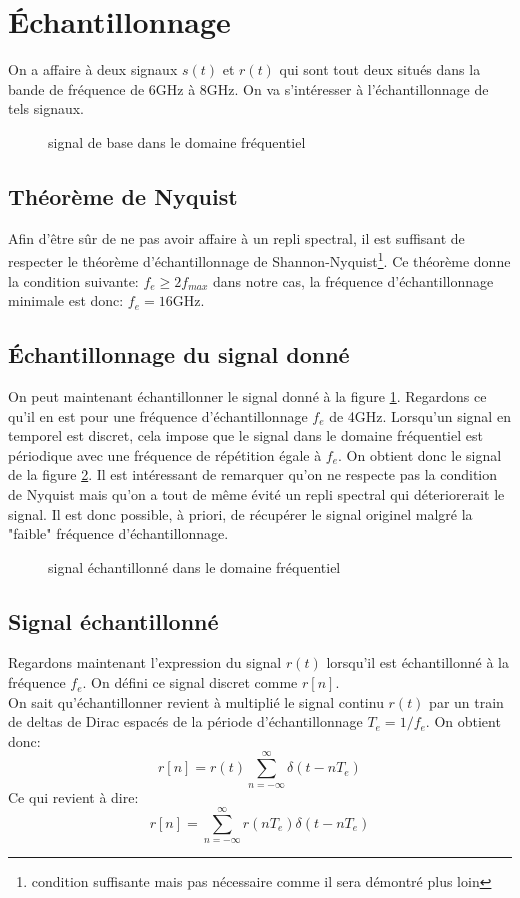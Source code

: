 \documentclass[10pt,a4paper]{article}
\begin{document}
\section{Échantillonnage}
On a affaire à deux signaux $s(t)$ et $r(t)$ qui sont tout deux situés dans la bande de fréquence de 6GHz à 8GHz. On va s'intéresser à l'échantillonnage de tels signaux.
\begin{figure}[h!]
\centering
\caption{signal de base dans le domaine fréquentiel}
\label{sig}
\end{figure}
\subsection{Théorème de Nyquist}
Afin d'être sûr de ne pas avoir affaire à un repli spectral, il est suffisant de respecter le théorème d'échantillonnage de Shannon-Nyquist\footnote{condition suffisante mais pas nécessaire comme il sera démontré plus loin}. Ce théorème donne la condition suivante: $f_e\geqslant 2f_{max}$ dans notre cas, la fréquence d'échantillonnage minimale est donc: $f_e=16\text{GHz}$.
\subsection{Échantillonnage du signal donné}
On peut maintenant échantillonner le signal donné à la figure \ref{sig}. Regardons ce qu'il en est pour une fréquence d'échantillonnage $f_e$ de 4GHz. Lorsqu'un signal en temporel est discret, cela impose que le signal dans le domaine fréquentiel est périodique avec une fréquence de répétition égale à $f_e$. On obtient donc le signal de la figure \ref{sig2}. Il est intéressant de remarquer qu'on ne respecte pas la condition de Nyquist mais qu'on a tout de même évité un repli spectral qui déteriorerait le signal. Il est donc possible, à priori, de récupérer le signal originel malgré la "faible" fréquence d'échantillonnage.
\begin{figure}[h!]
\centering
\caption{signal échantillonné dans le domaine fréquentiel}
\label{sig2}
\end{figure}
\subsection{Signal échantillonné}
Regardons maintenant l'expression du signal $r(t)$ lorsqu'il est échantillonné à la fréquence $f_e$. On défini ce signal discret comme $r[n]$.\\
On sait qu'échantillonner revient à multiplié le signal continu $r(t)$ par un train de deltas de Dirac espacés de la période d'échantillonnage $T_e=1/f_e$. On obtient donc:
$$r[n]=r(t)\sum_{n=-\infty}^{\infty}\delta (t-nT_e)$$
Ce qui revient à dire:
$$r[n]=\sum_{n=-\infty}^{\infty}r(nT_e)\delta (t-nT_e)$$
\end{document}
